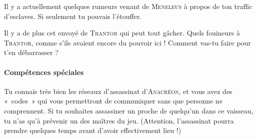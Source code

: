 \documentclass{article}
\begin{document}
{Il y a actuellement quelques rumeurs venant de \textsc{Meneleus} à propos de ton traffic d’esclaves.
Si seulement tu pouvais l’étouffer.

Il y a de plus cet envoyé de \textsc{Trantor} qui peut tout gâcher.
Quels fouineurs à \textsc{Trantor}, comme s’ils avaient encore du pouvoir ici !
Comment vas-tu faire pour t’en débarrasser ?

\paragraph{Compétences spéciales}
{
Tu connais très bien les réseaux d’assassinat d’\textsc{Anacréon}, et vous avez des «~codes~» qui vous permettront de communiquer sans que personne ne comprennent.
Si tu souhaites assassiner un proche de quelqu’un dans ce vaisseau, tu n’as qu’à prévenir un des maîtres du jeu.
(Attention, l’assassinat pourra prendre quelques temps avant d’avoir effectivement lieu !)
}
}
\end{document}
